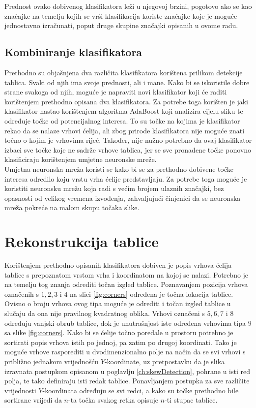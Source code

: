 \documentclass[times, utf8, zavrsni, numeric]{fer}
\begin{document}
Prednost ovako dobivenog klasifikatora leži u njegovoj brzini, pogotovo ako se kao značajke na temelju kojih se vrši klasifikacija koriste značajke koje je moguće jednostavno izračunati, poput druge skupine značajki opisanih u ovome radu.


\subsection{Kombiniranje klasifikatora}
Prethodno su objašnjena dva različita klasifikatora korištena prilikom detekcije tablica.
Svaki od njih ima svoje prednosti, ali i mane.
Kako bi se iskoristile dobre strane svakoga od njih, moguće je napraviti novi klasifikator koji će raditi korištenjem prethodno opisana dva klasifikatora.
Za potrebe toga korišten je jaki klasifikator nastao korištenjem algoritma AdaBoost koji analizira cijelu sliku te određuje točke od potencijalnog interesa. 
To su točke na kojima je klasifikator rekao da se nalaze vrhovi ćelija, ali zbog prirode klasifikatora nije moguće znati točno o kojim je vrhovima riječ.
Također, nije nužno potrebno da ovaj klasifikator izbaci sve točke koje ne sadrže vrhove tablica, jer se sve pronađene točke ponovno klasificiraju korištenjem umjetne neuronske mreže.\\

Umjetna neuronska mreža koristi se kako bi se za prethodno dobivene točke interesa odredilo koju vrstu vrha ćelije predstavljaju.
Za potrebe toga moguće je koristiti neuronsku mrežu koja radi s većim brojem ulaznih značajki, bez opasnosti od velikog vremena izvođenja, zahvaljujući činjenici da se neuronska mreža pokreće na malom skupu točaka slike. 

\section{Rekonstrukcija tablice}
Korištenjem prethodno opisanih klasifikatora dobiven je popis vrhova ćelija tablice s prepoznatom vrstom vrha i koordinatom na kojoj se nalazi.
Potrebno je na temelju tog znanja odrediti točan izgled tablice. 
Poznavanjem pozicija vrhova označenih s $1, 2, 3$ i $4$ na slici \ref{fig:corners} određena je točna lokacija tablice. 
Ovisno o broju vrhova ovog tipa moguće je odrediti i točan izgled tablice u slučaju da ona nije pravilnog kvadratnog oblika.
Vrhovi označeni s $5, 6, 7$ i $8$ određuju vanjski obrub tablice, dok je unutrašnjost iste određena vrhovima tipa $9$ sa slike \ref{fig:corners}.
Kako bi se ćelije točno poredale u prostoru potrebno je sortirati popis vrhova istih po jednoj, pa zatim po drugoj koordinati.
Tako je moguće vrhove rasporediti u dvodimenzionalno polje na način da se svi vrhovi s približno jednakom vrijednošću $Y$-koordinate, uz pretpostavku da je slika izravnata postupkom opisanom u poglavlju \ref{ch:skewDetection}, pohrane u isti red polja, te tako definiraju isti redak tablice.
Ponavljanjem postupka za sve različite vrijednosti $Y$-koordinata određuju se svi redci, a kako su točke prethodno bile sortirane vrijedi da $n$-ta točka svakog retka opisuje $n$-ti stupac tablice.
\end{document}
